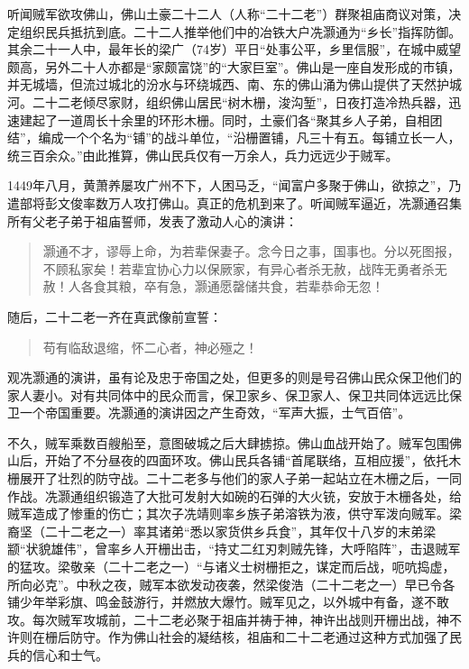 听闻贼军欲攻佛山，佛山土豪二十二人（人称“二十二老”）群聚祖庙商议对策，决定组织民兵抵抗到底。二十二人推举他们中的冶铁大户冼灏通为“乡长”指挥防御。其余二十一人中，最年长的梁广（74岁）平日“处事公平，乡里信服”，在城中威望颇高，另外二十人亦都是“家颇富饶”的“大家巨室”。佛山是一座自发形成的市镇，并无城墙，但流过城北的汾水与环绕城西、南、东的佛山涌为佛山提供了天然护城河。二十二老倾尽家财，组织佛山居民“树木栅，浚沟堑”，日夜打造冷热兵器，迅速建起了一道周长十余里的环形木栅。同时，土豪们各“聚其乡人子弟，自相团结”，编成一个个名为“铺”的战斗单位，“沿栅置铺，凡三十有五。每铺立长一人，统三百余众。”由此推算，佛山民兵仅有一万余人，兵力远远少于贼军。

1449年八月，黄萧养屡攻广州不下，人困马乏，“闻富户多聚于佛山，欲掠之”，乃遣部将彭文俊率数万人攻打佛山。真正的危机到来了。听闻贼军逼近，冼灏通召集所有父老子弟于祖庙誓师，发表了激动人心的演讲：

\begin{quote}

灏通不才，谬辱上命，为若辈保妻子。念今日之事，国事也。分以死图报，不顾私家矣！若辈宜协心力以保厥家，有异心者杀无赦，战阵无勇者杀无赦！人各食其粮，卒有急，灏通愿罄储共食，若辈恭命无忽！

\end{quote}

随后，二十二老一齐在真武像前宣誓：

\begin{quote}

苟有临敌退缩，怀二心者，神必殛之！

\end{quote}

观冼灏通的演讲，虽有论及忠于帝国之处，但更多的则是号召佛山民众保卫他们的家人妻小。对有共同体中的民众而言，保卫家乡、保卫家人、保卫共同体远远比保卫一个帝国重要。冼灏通的演讲因之产生奇效，“军声大振，士气百倍”。

不久，贼军乘数百艘船至，意图破城之后大肆掳掠。佛山血战开始了。贼军包围佛山后，开始了不分昼夜的四面环攻。佛山民兵各铺“首尾联络，互相应援”，依托木栅展开了壮烈的防守战。二十二老多与他们的家人子弟一起站立在木栅之后，一同作战。冼灏通组织锻造了大批可发射大如碗的石弹的大火铳，安放于木栅各处，给贼军造成了惨重的伤亡；其次子冼靖则率乡族子弟溶铁为液，供守军泼向贼军。梁裔坚（二十二老之一）率其诸弟“悉以家货供乡兵食”，其年仅十八岁的末弟梁颛“状貌雄伟”，曾率乡人开栅出击，“持丈二红刃刺贼先锋，大呼陷阵”，击退贼军的猛攻。梁敬亲（二十二老之一）“与诸义士树栅拒之，谋定而后战，呃吭捣虚，所向必克”。中秋之夜，贼军本欲发动夜袭，然梁俊浩（二十二老之一）早已令各铺少年举彩旗、鸣金鼓游行，并燃放大爆竹。贼军见之，以外城中有备，遂不敢攻。每次贼军攻城前，二十二老必聚于祖庙并祷于神，神许出战则开栅出战，神不许则在栅后防守。作为佛山社会的凝结核，祖庙和二十二老通过这种方式加强了民兵的信心和士气。

